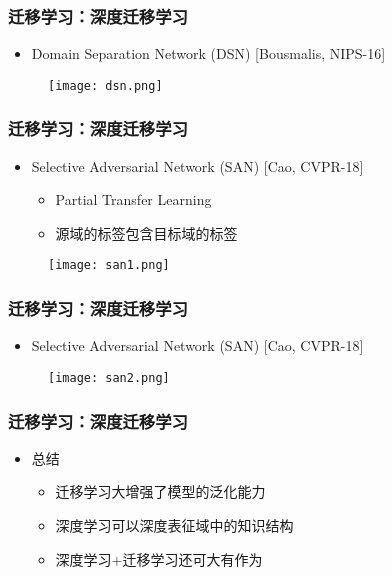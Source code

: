 \begin{frame}
    \frametitle{迁移学习：深度迁移学习}
    \begin{itemize}
        \item Domain Separation Network (DSN) [Bousmalis, NIPS-16]
    \end{itemize}
    \begin{figure}
        \texttt{[image: dsn.png]}
    \end{figure}
\end{frame}

\begin{frame}
    \frametitle{迁移学习：深度迁移学习}
    \begin{itemize}
        \item Selective Adversarial Network (SAN) [Cao, CVPR-18]
            \begin{itemize}
                \item Partial Transfer Learning
                \item 源域的标签包含目标域的标签
            \end{itemize}
    \end{itemize}
    \begin{figure}
        \texttt{[image: san1.png]}
    \end{figure}
\end{frame}

\begin{frame}
    \frametitle{迁移学习：深度迁移学习}
    \begin{itemize}
        \item Selective Adversarial Network (SAN) [Cao, CVPR-18]
    \end{itemize}
    \begin{figure}
        \texttt{[image: san2.png]}
    \end{figure}
\end{frame}

\begin{frame}
    \frametitle{迁移学习：深度迁移学习}
    \begin{itemize}
        \item 总结
        \begin{itemize}
            \item 迁移学习大增强了模型的泛化能力
            \item 深度学习可以深度表征域中的知识结构
            \item 深度学习+迁移学习还可大有作为
        \end{itemize}
    \end{itemize}
\end{frame}